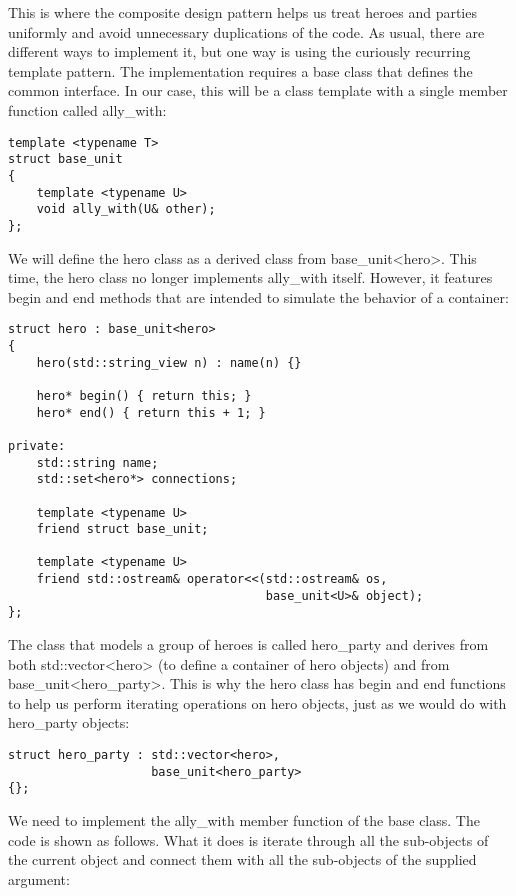 This is where the composite design pattern helps us treat heroes and parties uniformly and avoid unnecessary duplications of the code. As usual, there are different ways to implement it, but one way is using the curiously recurring template pattern. The implementation requires a base class that defines the common interface. In our case, this will be a class template with a single member function called ally\_with:

\begin{lstlisting}[style=styleCXX]
template <typename T>
struct base_unit
{
	template <typename U>
	void ally_with(U& other);
};
\end{lstlisting}

We will define the hero class as a derived class from base\_unit<hero>. This time, the hero class no longer implements ally\_with itself. However, it features begin and end methods that are intended to simulate the behavior of a container:

\begin{lstlisting}[style=styleCXX]
struct hero : base_unit<hero>
{
	hero(std::string_view n) : name(n) {}
	
	hero* begin() { return this; }
	hero* end() { return this + 1; }
	
private:
	std::string name;
	std::set<hero*> connections;
	
	template <typename U>
	friend struct base_unit;
	
	template <typename U>
	friend std::ostream& operator<<(std::ostream& os,
									base_unit<U>& object);
};
\end{lstlisting}

The class that models a group of heroes is called hero\_party and derives from both std::vector<hero> (to define a container of hero objects) and from base\_unit<hero\_party>. This is why the hero class has begin and end functions to help us perform iterating operations on hero objects, just as we would do with hero\_party objects:

\begin{lstlisting}[style=styleCXX]
struct hero_party : std::vector<hero>,
					base_unit<hero_party>
{};
\end{lstlisting}

We need to implement the ally\_with member function of the base class. The code is shown as follows. What it does is iterate through all the sub-objects of the current object and connect them with all the sub-objects of the supplied argument:

